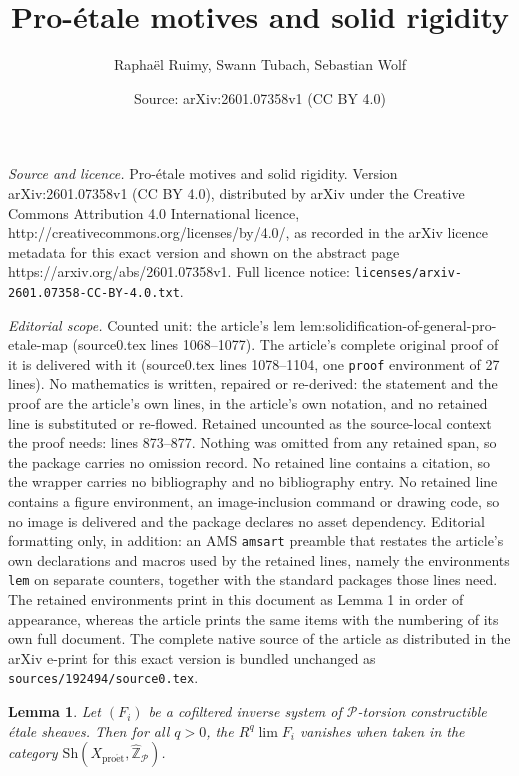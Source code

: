 \documentclass[10pt,a4paper]{amsart}
\title{Pro-étale motives and solid rigidity}
\author{Rapha\"el Ruimy, Swann Tubach, Sebastian Wolf}
\date{Source: arXiv:2601.07358v1 (CC BY 4.0)}
\newtheorem{lem}{Lemma}
\newcommand{\Sh}{\mathrm{Sh}}
\newcommand{\Z}{\mathbb{Z}}
\newcommand{\ZhatP}{\widehat{\Z}_\mc{P}}
\newcommand{\mc}{\mathcal}
\newcommand{\proet}{\mathrm{pro\acute{e}t}}
\begin{document}
\maketitle

\noindent\emph{Source and licence.} Pro-étale motives and solid rigidity. Version arXiv:2601.07358v1 (CC BY 4.0), distributed by arXiv under the Creative Commons Attribution 4.0 International licence, http://creativecommons.org/licenses/by/4.0/, as recorded in the arXiv licence metadata for this exact version and shown on the abstract page https://arxiv.org/abs/2601.07358v1. Full licence notice: \texttt{licenses/arxiv-2601.07358-CC-BY-4.0.txt}.\par\smallskip

\noindent\textit{Editorial scope.} Counted unit: the article's lem lem:solidification-of-general-pro-etale-map (source0.tex lines 1068--1077). The article's complete original proof of it is delivered with it (source0.tex lines 1078--1104, one \texttt{proof} environment of 27 lines). No mathematics is written, repaired or re-derived: the statement and the proof are the article's own lines, in the article's own notation, and no retained line is substituted or re-flowed.  Retained uncounted as the source-local context the proof needs: lines 873--877.  Nothing was omitted from any retained span, so the package carries no omission record.  No retained line contains a citation, so the wrapper carries no bibliography and no bibliography entry.  No retained line contains a figure environment, an image-inclusion command or drawing code, so no image is delivered and the package declares no asset dependency.  Editorial formatting only, in addition: an AMS \texttt{amsart} preamble that restates the article's own declarations and macros used by the retained lines, namely the environments \texttt{lem} on separate counters, together with the standard packages those lines need.  The retained environments print in this document as Lemma 1 in order of appearance, whereas the article prints the same items with the numbering of its own full document.  The complete native source of the article as distributed in the arXiv e-print for this exact version is bundled unchanged as \texttt{sources/192494/source0.tex}.
\begin{lem}
\label{limIsRlim}
	Let $(F_i)$ be a cofiltered inverse system of
$\mc{P}$-torsion constructible étale sheaves. Then for all $q>0$, the $R^q\lim F_i$ vanishes when taken in the category $\Sh(X_\proet,\ZhatP)$. %
\end{lem}
\end{document}
